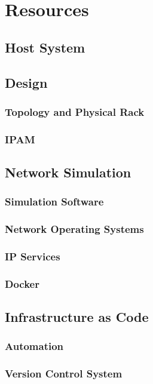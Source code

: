 \documentclass[12pt, letterpaper]{article}
\begin{document}
		



\newpage

\section{Resources}
	
	\subsection{Host System}
	
	\subsection{Design}
		\subsubsection{Topology and Physical Rack}
		\subsubsection{IPAM}
	
	\subsection{Network Simulation}
		\subsubsection{Simulation Software}
		\subsubsection{Network Operating Systems}
		\subsubsection{IP Services}
		\subsubsection{Docker}
		
	\subsection{Infrastructure as Code}
		\subsubsection{Automation}
		\subsubsection{Version Control System}
\end{document}
